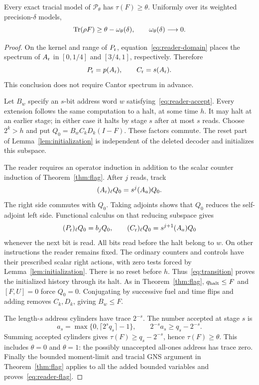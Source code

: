 \begin{lemma}\label{lem:reader-forcing}
Every exact tracial model of $\mathcal P_\theta$ has $\tau(F)\ge\theta$. Uniformly over its weighted precision-$\delta$ models,
\begin{equation}\label{eq:reader-flag}
 \operatorname{Tr}(\rho F)\ge\theta-\omega_\theta(\delta),\qquad
 \omega_\theta(\delta)\longrightarrow0.
\end{equation}
\end{lemma}
\begin{proof}
On the kernel and range of $P_{\rm r}$, equation~\eqref{eq:reader-domain} places the spectrum of $A_{\rm r}$ in $[0,1/4]$ and $[3/4,1]$, respectively. Therefore
\[
 P_{\rm r}=p(A_{\rm r}),\qquad C_{\rm r}=s(A_{\rm r}).
\]
This conclusion does not require Cantor spectrum in advance.

Let $B_w$ specify an $s$-bit address word $w$ satisfying~\eqref{eq:reader-accept}. Every extension follows the same computation to a halt, at some time $h$. It may halt at an earlier stage; in either case it halts by stage $s$ after at most $s$ reads. Choose $2^k>h$ and put $Q_0=B_wC_kD_k(I-F)$. These factors commute. The reset part of Lemma~\ref{lem:initialization} is independent of the deleted decoder and initializes this subspace.

The reader requires an operator induction in addition to the scalar counter induction of Theorem~\ref{thm:flag}. After $j$ reads, track
\begin{equation}\label{eq:reader-induction}
 (A_{\rm r})_\ell Q_0=s^j(A_a)Q_0.
\end{equation}
The right side commutes with $Q_0$. Taking adjoints shows that $Q_0$ reduces the self-adjoint left side. Functional calculus on that reducing subspace gives
\[
 (P_{\rm r})_\ell Q_0=b_jQ_0,\qquad
 (C_{\rm r})_\ell Q_0=s^{j+1}(A_a)Q_0
\]
whenever the next bit is read. All bits read before the halt belong to $w$. On other instructions the reader remains fixed. The ordinary counters and controls have their prescribed scalar right actions, with zero tests forced by Lemma~\ref{lem:initialization}. There is no reset before $h$. Thus~\eqref{eq:transition} proves the initialized history through its halt. As in Theorem~\ref{thm:flag}, $q_{\rm halt}\le F$ and $[F,U]=0$ force $Q_0=0$. Conjugating by successive fuel and time flips and adding removes $C_k,D_k$, giving $B_w\le F$.

The length-$s$ address cylinders have trace $2^{-s}$. The number accepted at stage $s$ is
\[
 a_s=\max\{0,\lceil2^sq_s\rceil-1\},\qquad
 2^{-s}a_s\ge q_s-2^{-s}.
\]
Summing accepted cylinders gives $\tau(F)\ge q_s-2^{-s}$, hence $\tau(F)\ge\theta$. This includes $\theta=0$ and $\theta=1$: the possibly unaccepted all-ones address has trace zero. Finally the bounded moment-limit and tracial GNS argument in Theorem~\ref{thm:flag} applies to all the added bounded variables and proves~\eqref{eq:reader-flag}.
\end{proof}

